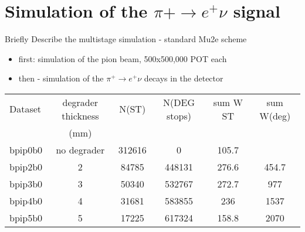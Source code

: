 \section{Simulation of the $\pi+ \to e^+ \nu $ signal }

{\red Briefly Describe the multistage simulation - standard Mu2e scheme
  \begin{itemize}
  \item
    first: simulation of the pion beam, 500x500,000 POT each
  \item
    then - simulation of the $\pi^+ \to e^+ \nu$ decays in the detector
  \end{itemize}
}

\begin{tabularx}{1.0\textwidth} {|X|c|c|c|c|c|}  %
  \hline
  Dataset             & degrader thickness & N(ST)       & N(DEG stops) & sum W ST  & sum W(deg)  \\
                      & (mm)               &             &              &           &             \\
  \hline                                                                                          
  bpip0b0             &  no degrader       &   312616    &     0        &   105.7   &              \\
  \hline                                                                                          
  bpip2b0             &     2              &   84785     &   448131     &   276.6   &   454.7      \\
  \hline                                                                                          
  bpip3b0             &     3              &   50340     &   532767     &  272.7    &   977        \\
  \hline                                                                                        
  bpip4b0             &     4              &   31681     &   583855     &  236      &  1537       \\
  \hline                                                                                          
  bpip5b0             &     5              &   17225     &   617324     &  158.8    &   2070       \\
  \hline
\end{tabularx}


